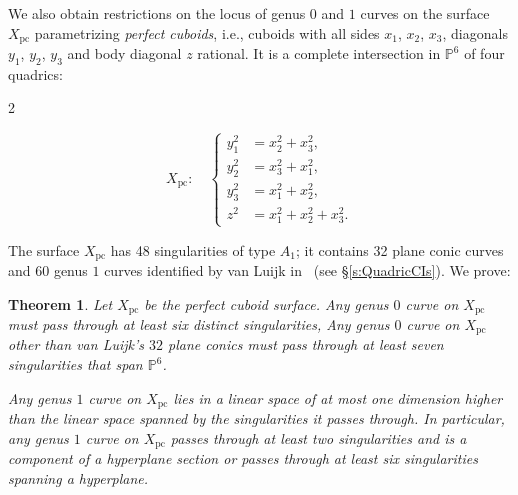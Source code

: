 \documentclass[12pt, reqno]{amsart}
\newtheorem{theorem}[lemma]{Theorem}
\theoremstyle{definition}
\newcommand{\PP}{{\mathbb P}}
\newcommand{\Xpc}{X_\mathrm{pc}}
\numberwithin{equation}{section}
\numberwithin{table}{section}
\begin{document}
We also obtain restrictions on the locus of genus $0$ and $1$ curves on the surface $\Xpc$ parametrizing \emph{perfect cuboids}, i.e., cuboids with all sides $x_1$, $x_2$, $x_3$, diagonals $y_1$, $y_2$, $y_3$ and body diagonal $z$ rational.  It is a complete intersection in $\PP^6$ of four quadrics: 
\begin{multicols}{2}
\begin{flushright}
\end{flushright}

\begin{flushleft}
{
\[\Xpc : \quad
\left\{
\begin{split}
y_1^2&=x_2^2+x_3^2,\\
y_2^2&=x_3^2+x_1^2,\\
y_3^2&=x_1^2+x_2^2,\\
z^2&=x_1^2+x_2^2+x_3^2.
\end{split}\right.
\]
}

\end{flushleft}
\end{multicols}
\noindent The surface $\Xpc$ has 48 singularities of type $A_1$; it contains 32 plane conic curves and 60 genus $1$ curves identified by van Luijk in~\cite{vanLuijk2000} (see \S\ref{s:QuadricCIs}). We prove:

\begin{theorem}
\label{thm:CuboidIntro}
Let $\Xpc$ be the perfect cuboid surface. Any genus $0$ curve on $\Xpc$ must pass through at least six distinct singularities, Any genus $0$ curve on $\Xpc$ other than van Luijk's $32$ plane conics must pass through at least seven singularities that span $\PP^6$.

Any genus $1$ curve on $\Xpc$ lies in a linear space of at most one dimension higher than the linear space spanned by the singularities it passes through. In particular, any genus $1$ curve on $\Xpc$ passes through at least two singularities and is a component of a hyperplane section or passes through at least six singularities spanning a hyperplane.
\end{theorem}
\end{document}
